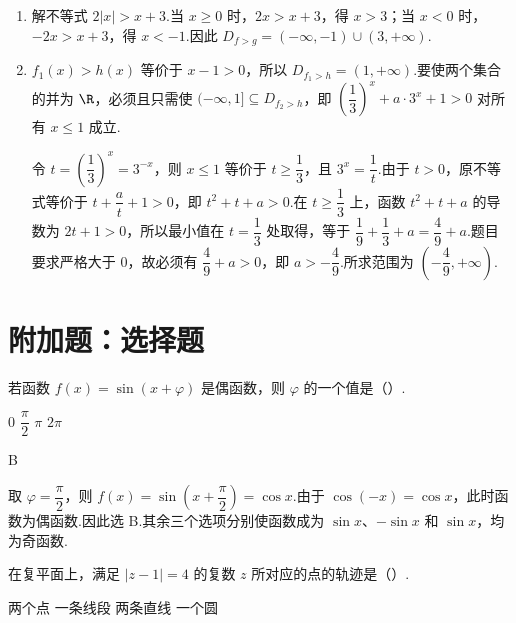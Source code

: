 \begin{solution}
\begin{enumerate}
\item 解不等式 \(2|x|>x+3\).当 \(x\geq0\) 时，\(2x>x+3\)，得 \(x>3\)；当 \(x<0\) 时，\(-2x>x+3\)，得 \(x<-1\).因此
\(D_{f>g}=(-\infty,-1)\cup(3,+\infty)\).

\item \(f_1(x)>h(x)\) 等价于 \(x-1>0\)，所以 \(D_{f_1>h}=(1,+\infty)\).要使两个集合的并为 \(\R\)，必须且只需使 \((-\infty,1]\subseteq D_{f_2>h}\)，即
\(\left(\dfrac13\right)^x+a\cdot3^x+1>0\) 对所有 \(x\leq1\) 成立.

令 \(t=\left(\dfrac13\right)^x=3^{-x}\)，则 \(x\leq1\) 等价于 \(t\geq\dfrac13\)，且 \(3^x=\dfrac1t\).由于 \(t>0\)，原不等式等价于
\(t+\dfrac at+1>0\)，即 \(t^2+t+a>0\).在 \(t\geq\dfrac13\) 上，函数 \(t^2+t+a\) 的导数为 \(2t+1>0\)，所以最小值在 \(t=\dfrac13\) 处取得，等于 \(\dfrac19+\dfrac13+a=\dfrac49+a\).题目要求严格大于 \(0\)，故必须有 \(\dfrac49+a>0\)，即 \(a>-\dfrac49\).所求范围为 \(\left(-\dfrac49,+\infty\right)\).
\end{enumerate}
\end{solution}

\section{附加题：选择题}

\begin{problem}
若函数 \(f(x)=\sin(x+\varphi)\) 是偶函数，则 \(\varphi\) 的一个值是（\quad）.

\choices
    {\(0\)}
    {\(\dfrac\pi2\)}
    {\(\pi\)}
    {\(2\pi\)}
\end{problem}

\begin{answer}
B
\end{answer}

\begin{solution}
取 \(\varphi=\dfrac\pi2\)，则 \(f(x)=\sin\left(x+\dfrac\pi2\right)=\cos x\).由于 \(\cos(-x)=\cos x\)，此时函数为偶函数.因此选 B.其余三个选项分别使函数成为 \(\sin x\)、\(-\sin x\) 和 \(\sin x\)，均为奇函数.
\end{solution}

\begin{problem}
在复平面上，满足 \(\lvert z-1\rvert=4\) 的复数 \(z\) 所对应的点的轨迹是（\quad）.

\choices
    {两个点}
    {一条线段}
    {两条直线}
    {一个圆}
\end{problem}

